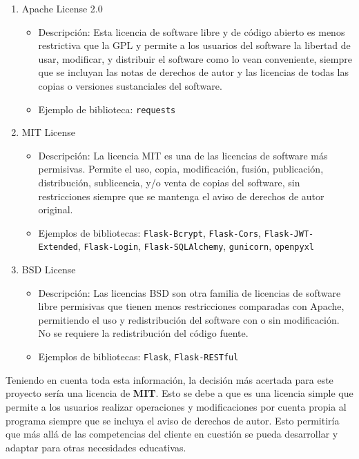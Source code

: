 \begin{itemize}
\begin{enumerate}
    \item Apache License 2.0
    \begin{itemize}
        \item Descripción: Esta licencia de software libre y de código abierto es menos restrictiva que la GPL y permite a los usuarios del software la libertad de usar, modificar, y distribuir el software como lo vean conveniente, siempre que se incluyan las notas de derechos de autor y las licencias de todas las copias o versiones sustanciales del software.
        \item Ejemplo de biblioteca: \verb|requests|
    \end{itemize}
    \item MIT License
    \begin{itemize}
        \item Descripción: La licencia MIT es una de las licencias de software más permisivas. Permite el uso, copia, modificación, fusión, publicación, distribución, sublicencia, y/o venta de copias del software, sin restricciones siempre que se mantenga el aviso de derechos de autor original.
        \item Ejemplos de bibliotecas: \verb|Flask-Bcrypt|, \verb|Flask-Cors|, \verb|Flask-JWT-Extended|, \verb|Flask-Login|, \verb|Flask-SQLAlchemy|, \verb|gunicorn|, \verb|openpyxl|
    \end{itemize}
    \item BSD License
    \begin{itemize}
        \item Descripción: Las licencias BSD son otra familia de licencias de software libre permisivas que tienen menos restricciones comparadas con Apache, permitiendo el uso y redistribución del software con o sin modificación. No se requiere la redistribución del código fuente.
        \item Ejemplos de bibliotecas: \verb|Flask|, \verb|Flask-RESTful|
    \end{itemize}
\end{enumerate}
 
\end{itemize}

Teniendo en cuenta toda esta información, la decisión más acertada para este proyecto sería una licencia de \textbf{MIT}. Esto se debe a que es una licencia simple que permite a los usuarios realizar operaciones y modificaciones por cuenta propia al programa siempre que se incluya el aviso de derechos de autor.
Esto permitiría que más allá de las competencias del cliente en cuestión se pueda desarrollar y adaptar para otras necesidades educativas.

